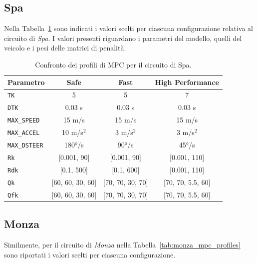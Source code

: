 \subsection{Spa}
Nella Tabella~\ref{tab:spa_mpc_profiles} sono indicati i valori scelti per ciascuna configurazione 
relativa al circuito di \textit{Spa}. I valori presenti riguardano i parametri del modello, quelli del veicolo e i pesi delle matrici di penalità.

\begin{table}[H]
\centering
\begin{tabular}{|l|c|c|c|}
\hline
\textbf{Parametro} & \textbf{Safe} & \textbf{Fast} & \textbf{High Performance} \\
\hline
\verb|TK| & 5 & 5 & 7 \\
\verb|DTK| & 0.03 s & 0.03 s & 0.03 s \\
\verb|MAX_SPEED| & 15 m/s & 15 m/s & 15 m/s \\
\verb|MAX_ACCEL| & 10 m/s$^2$ & 3 m/s$^2$ & 3 m/s$^2$ \\
\verb|MAX_DSTEER| & 180°/s & 90°/s & 45°/s \\
\verb|Rk| & [0.001, 90] & [0.001, 90] & [0.001, 110] \\
\verb|Rdk| & [0.1, 500] & [0.1, 600] & [0.001, 110] \\
\verb|Qk| & [60, 60, 30, 60] & [70, 70, 30, 70] & [70, 70, 5.5, 60] \\
\verb|Qfk| & [60, 60, 30, 60] & [70, 70, 30, 70] & [70, 70, 5.5, 60] \\
\hline
\end{tabular}
\caption{Confronto dei profili di MPC per il circuito di Spa.}
\label{tab:spa_mpc_profiles}
\end{table}

\subsection{Monza}
Similmente, per il circuito di \textit{Monza} nella Tabella~\ref{tab:monza_mpc_profiles} sono
riportati i valori scelti per ciascuna configurazione.

